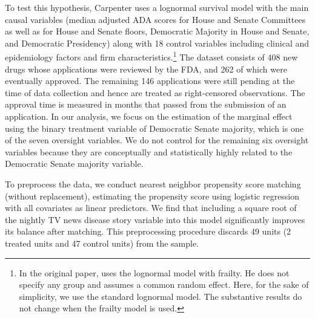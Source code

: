 \documentclass[11pt,titlepage]{article}
\begin{document}
To test this hypothesis, Carpenter uses a lognormal survival model with the
main causal variables (median adjusted ADA scores for House and Senate
Committees as well as for House and Senate floors, Democratic Majority
in House and Senate, and Democratic Presidency) along with 18 control
variables including clinical and epidemiology factors and firm
characteristics.\footnote{In the original paper, \citet{Carp02} uses
  the lognormal model with frailty. He does not specify any group and
  assumes a common random effect.  Here, for the sake of simplicity, we
  use the standard lognormal model. The substantive results do not
  change when the frailty model is used.}  The dataset consists of 408
new drugs whose applications were reviewed by the FDA, and 262 of
which were eventually approved. The remaining 146 applications were
still pending at the time of data collection and hence are
treated as right-censored observations. The approval time is measured
in months that passed from the submission of an application.  In our
analysis, we focus on the estimation of the marginal effect using the
binary treatment variable of Democratic Senate majority, which is one
of the seven oversight variables. We do not control for the remaining
six oversight variables because they are conceptually and
statistically highly related to the Democratic Senate majority
variable.

To preprocess the data, we conduct nearest neighbor propensity
score matching (without replacement), estimating the propensity score using logistic regression
with all covariates as linear predictors. We find that including a
square root of the nightly TV news disease story variable into this
model significantly improves its balance after matching. This
preprocessing procedure discards 49 units (2 treated units and 47
control units) from the sample. 
\end{document}
